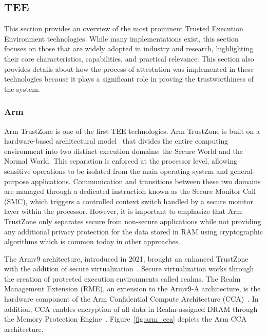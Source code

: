 \documentclass[futureinternet,article,submit,moreauthors]{Definitions/mdpi}
\begin{document}
\subsection{TEE}

This section provides an overview of the most prominent Trusted Execution Environment technologies. While many implementations exist, this section focuses on those that are widely adopted in industry and research, highlighting their core characteristics, capabilities, and practical relevance. This section also provides details about how the process of attestation was implemented in these technologies because it plays a significant role in proving the trustworthiness of the system.

\subsubsection{Arm}

Arm TrustZone is one of the first TEE technologies. Arm TrustZone is built on a hardware-based architectural model~\cite{pinto_demystifying_2019} that divides the entire computing environment into two distinct execution domains: the Secure World and the Normal World. This separation is enforced at the processor level, allowing sensitive operations to be isolated from the main operating system and general-purpose applications. Communication and transitions between these two domains are managed through a dedicated instruction known as the Secure Monitor Call (SMC), which triggers a controlled context switch handled by a secure monitor layer within the processor. However, it is important to emphasize that Arm TrustZone only separates secure from non-secure applications while not providing any additional privacy protection for the data stored in RAM using cryptographic algorithms which is common today in other approaches.

The Armv9 architecture, introduced in 2021, brought an enhanced TrustZone with the addition of secure virtualization~\cite{li_design_2022}. Secure virtualization works through the creation of protected execution environments called realms. The Realm Management Extension (RME), an extension to the Armv9-A architecture, is the hardware component of the Arm Confidential Compute Architecture (CCA)~\cite{noauthor_learn_2025}. In addition, CCA enables encryption of all data in Realm-assigned DRAM through the Memory Protection Engine~\cite{noauthor_learn_2025}. Figure~\ref{fig:arm_cca} depicts the Arm CCA architecture.
\end{document}
